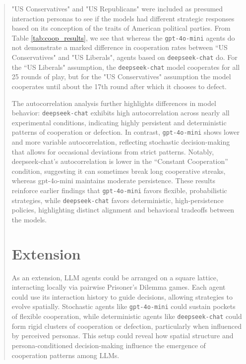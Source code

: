\documentclass[%
 reprint,
 amsmath,amssymb,
 aps,
]{revtex4-2}
\begin{document}
\begin{abstract}
"US Conservatives" and "US Republicans" were included as presumed interaction personas to see if the models had different strategic responses based on its conception of the traits of American political parties. From Table \ref{tab:coop_results}, we see that whereas the \texttt{gpt-4o-mini} agents do not demonstrate a marked difference in cooperation rates between ``US Conservatives" and "US Liberals", agents based on \texttt{deepseek-chat} do. For the ``US Liberals" assumption, the \texttt{deepseek-chat} model cooperates for all 25 rounds of play, but for the "US Conservatives" assumption the model cooperates until about the 17th round after which it chooses to defect. 

The autocorrelation analysis further highlights differences in model behavior: \texttt{deepseek-chat} exhibits high autocorrelation across nearly all experimental conditions, indicating highly persistent and deterministic patterns of cooperation or defection. In contrast, \texttt{gpt-4o-mini} shows lower and more variable autocorrelation, reflecting stochastic decision-making that allows for occasional deviations from strict patterns. Notably, deepseek-chat’s autocorrelation is lower in the “Constant Cooperation” condition, suggesting it can sometimes break long cooperative streaks, whereas gpt-4o-mini maintains moderate persistence. These results reinforce earlier findings that \texttt{gpt-4o-mini} favors flexible, probabilistic strategies, while \texttt{deepseek-chat} favors deterministic, high-persistence policies, highlighting distinct alignment and behavioral tradeoffs between the models.

\section{Extension}

As an extension, LLM agents could be arranged on a square lattice, interacting locally via pairwise Prisoner’s Dilemma games. Each agent could use its interaction history to guide decisions, allowing strategies to evolve spatially. Stochastic agents like \texttt{gpt-4o-mini} could sustain pockets of flexible cooperation, while deterministic agents like \texttt{deepseek-chat} could form rigid clusters of cooperation or defection, particularly when influenced by perceived personas. This setup could reveal how spatial structure and persona-conditioned decision-making influence the emergence of cooperation patterns among LLMs.



\end{abstract}
\end{document}
